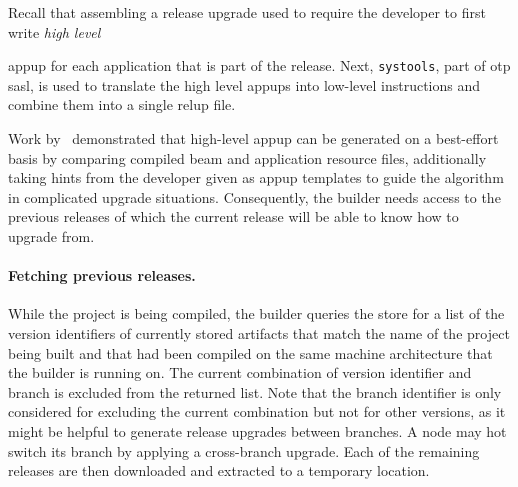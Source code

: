 Recall that assembling a release upgrade used to require the developer to first write \emph{high level} {\acrfull{appup} for each application that is part of the release. Next, \lstinline|systools|, part of \acrshort{otp} \acrfull{sasl}, is used to translate the high level appups into low-level instructions and combine them into a single \acrfull{relup} file.~\cite{doc:otp}

Work by~\cite{rebar3appup} demonstrated that high-level \acrlong{appup} can be generated on a best-effort basis by comparing compiled \acrshort{beam} and application resource files, additionally taking hints from the developer given as appup templates to guide the algorithm in complicated upgrade situations. Consequently, the builder needs access to the previous releases of which the current release will be able to know how to upgrade from.

\paragraph{Fetching previous releases.} While the project is being compiled, the builder queries the store for a list of the version identifiers of currently stored artifacts that match the name of the project being built and that had been compiled on the same machine architecture that the builder is running on. The current combination of version identifier and branch is excluded from the returned list. Note that the branch identifier is only considered for excluding the current combination but not for other versions, as it might be helpful to generate release upgrades between branches. A node may hot switch its branch by applying a cross-branch upgrade. Each of the remaining releases are then downloaded and extracted to a temporary location.

\cleardoublepage
}
